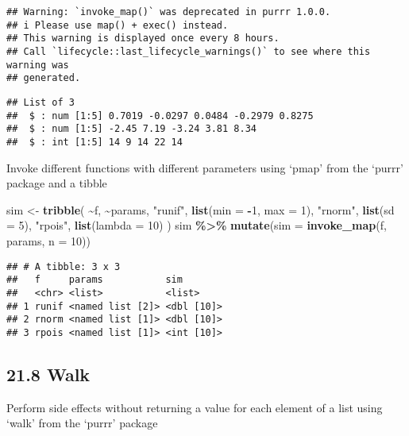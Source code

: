 \documentclass[
]{article}
\newenvironment{Shaded}{\begin{snugshade}}{\end{snugshade}}
\newcommand{\AttributeTok}[1]{\textcolor[rgb]{0.13,0.29,0.53}{#1}}
\newcommand{\DecValTok}[1]{\textcolor[rgb]{0.00,0.00,0.81}{#1}}
\newcommand{\FunctionTok}[1]{\textcolor[rgb]{0.13,0.29,0.53}{\textbf{#1}}}
\newcommand{\NormalTok}[1]{#1}
\newcommand{\OtherTok}[1]{\textcolor[rgb]{0.56,0.35,0.01}{#1}}
\newcommand{\SpecialCharTok}[1]{\textcolor[rgb]{0.81,0.36,0.00}{\textbf{#1}}}
\newcommand{\StringTok}[1]{\textcolor[rgb]{0.31,0.60,0.02}{#1}}
\begin{document}
\begin{verbatim}
## Warning: `invoke_map()` was deprecated in purrr 1.0.0.
## i Please use map() + exec() instead.
## This warning is displayed once every 8 hours.
## Call `lifecycle::last_lifecycle_warnings()` to see where this warning was
## generated.
\end{verbatim}

\begin{verbatim}
## List of 3
##  $ : num [1:5] 0.7019 -0.0297 0.0484 -0.2979 0.8275
##  $ : num [1:5] -2.45 7.19 -3.24 3.81 8.34
##  $ : int [1:5] 14 9 14 22 14
\end{verbatim}

Invoke different functions with different parameters using `pmap' from
the `purrr' package and a tibble

\begin{Shaded}
\begin{Highlighting}[]
\NormalTok{sim }\OtherTok{\textless{}{-}} \FunctionTok{tribble}\NormalTok{(}
  \SpecialCharTok{\textasciitilde{}}\NormalTok{f,      }\SpecialCharTok{\textasciitilde{}}\NormalTok{params,}
  \StringTok{"runif"}\NormalTok{, }\FunctionTok{list}\NormalTok{(}\AttributeTok{min =} \SpecialCharTok{{-}}\DecValTok{1}\NormalTok{, }\AttributeTok{max =} \DecValTok{1}\NormalTok{),}
  \StringTok{"rnorm"}\NormalTok{, }\FunctionTok{list}\NormalTok{(}\AttributeTok{sd =} \DecValTok{5}\NormalTok{),}
  \StringTok{"rpois"}\NormalTok{, }\FunctionTok{list}\NormalTok{(}\AttributeTok{lambda =} \DecValTok{10}\NormalTok{)}
\NormalTok{)}
\NormalTok{sim }\SpecialCharTok{\%\textgreater{}\%} 
  \FunctionTok{mutate}\NormalTok{(}\AttributeTok{sim =} \FunctionTok{invoke\_map}\NormalTok{(f, params, }\AttributeTok{n =} \DecValTok{10}\NormalTok{))}
\end{Highlighting}
\end{Shaded}

\begin{verbatim}
## # A tibble: 3 x 3
##   f     params           sim       
##   <chr> <list>           <list>    
## 1 runif <named list [2]> <dbl [10]>
## 2 rnorm <named list [1]> <dbl [10]>
## 3 rpois <named list [1]> <int [10]>
\end{verbatim}

\hypertarget{walk}{%
\subsection{21.8 Walk}\label{walk}}

Perform side effects without returning a value for each element of a
list using `walk' from the `purrr' package
\end{document}
